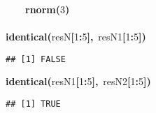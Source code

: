 \documentclass[a4paper,12pt]{article}\usepackage{graphicx, color}
\makeatletter
\newcommand{\hlnumber}[1]{\textcolor[rgb]{0,0,0}{#1}}%
\newcommand{\hlfunctioncall}[1]{\textcolor[rgb]{0.501960784313725,0,0.329411764705882}{\textbf{#1}}}%
\newcommand{\hlkeyword}[1]{\textcolor[rgb]{0,0,0}{\textbf{#1}}}%
\newcommand{\hlsymbol}[1]{\textcolor[rgb]{0,0,0}{#1}}%
\newcommand{\hlstd}[1]{\textcolor[rgb]{0,0,0}{#1}}%
\newenvironment{kframe}{%
 \def\FrameCommand##1{\hskip\@totalleftmargin \hskip-\fboxsep
 \colorbox{shadecolor}{##1}\hskip-\fboxsep
     \hskip-\linewidth \hskip-\@totalleftmargin \hskip\columnwidth}%
 \MakeFramed {\advance\hsize-\width
   \@totalleftmargin\z@ \linewidth\hsize
   \@setminipage}}%
 {\par\unskip\endMakeFramed}
\newenvironment{knitrout}{}{} %
\renewenvironment{knitrout}{\begin{footnotesize}}{\end{footnotesize}}
\makeatother
\begin{document}
\begin{description}
\begin{knitrout}
\begin{kframe}
\begin{flushleft}
\hlstd{}{\ }{\ }{\ }{\ }\hlfunctioncall{rnorm}\hlkeyword{(}\hlnumber{3}\hlkeyword{)}\hspace*{\fill}\\
\hlstd{}\hlkeyword{\usebox{\hlnormalsizeboxclosebrace}}\hspace*{\fill}\\
\hlstd{}\hlfunctioncall{identical}\hlkeyword{(}\hlsymbol{resN}\hlkeyword{[}\hlnumber{1}\hlkeyword{:}\hlnumber{5}\hlkeyword{]}\hlkeyword{,}{\ }\hlsymbol{resN1}\hlkeyword{[}\hlnumber{1}\hlkeyword{:}\hlnumber{5}\hlkeyword{]}\hlkeyword{)}\mbox{}
\normalfont
\end{flushleft}
\begin{verbatim}
## [1] FALSE
\end{verbatim}
\begin{flushleft}
\ttfamily\noindent
\hlfunctioncall{identical}\hlkeyword{(}\hlsymbol{resN1}\hlkeyword{[}\hlnumber{1}\hlkeyword{:}\hlnumber{5}\hlkeyword{]}\hlkeyword{,}{\ }\hlsymbol{resN2}\hlkeyword{[}\hlnumber{1}\hlkeyword{:}\hlnumber{5}\hlkeyword{]}\hlkeyword{)}\mbox{}
\normalfont
\end{flushleft}
\begin{verbatim}
## [1] TRUE
\end{verbatim}
\end{kframe}
\end{knitrout}


\end{description}
\end{document}
